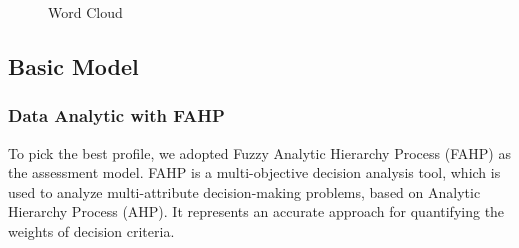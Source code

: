 \documentclass[12pt]{article}  %
\begin{document}
\begin{figure}[!htbp]
\centering
{}%
%
\centering
\caption{Word Cloud}
\end{figure}




\subsection{Basic Model}


\subsubsection{Data Analytic with FAHP}

To pick the best profile, we adopted Fuzzy Analytic Hierarchy Process (FAHP) as the assessment model. FAHP is a multi-objective decision analysis tool, which is used to analyze multi-attribute decision-making problems, based on Analytic Hierarchy Process (AHP). It represents an accurate approach for quantifying the weights of decision criteria\cite{2}. 
\end{document}
